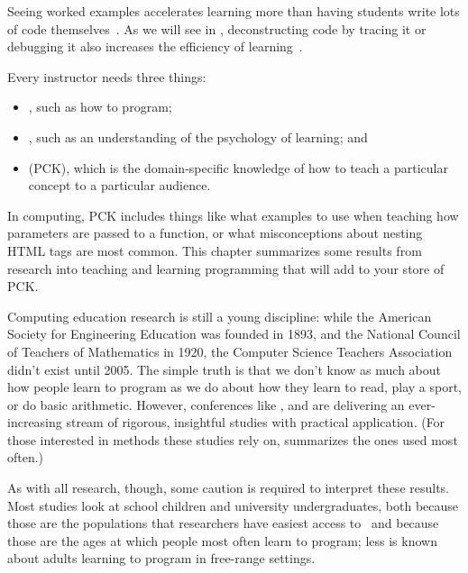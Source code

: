 
  Seeing worked examples accelerates learning
  more than having students write lots of code themselves~\cite{Skud2014}.
  As we will see in ,
  deconstructing code by tracing it or debugging it also increases the efficiency of learning~\cite{Grif2016}.

Every instructor needs three things:

\begin{itemize}
\item
  , such as how to
  program;
\item
  ,
  such as an understanding of the psychology of learning; and
\item
  (PCK), which is the domain-specific knowledge of how to teach a
  particular concept to a particular audience.
\end{itemize}

In computing, PCK includes things like what examples to use when
teaching how parameters are passed to a function, or what misconceptions
about nesting HTML tags are most common. This chapter summarizes some
results from research into teaching and learning programming that will
add to your store of PCK.

Computing education research is still a young discipline: while the
American Society for Engineering Education was founded in 1893, and
the National Council of Teachers of Mathematics in 1920, the Computer
Science Teachers Association didn't exist until 2005. The simple truth
is that we don't know as much about how people learn to program as we
do about how they learn to read, play a sport, or do basic arithmetic.
However, conferences like ,  and
 are delivering an ever-increasing stream of rigorous,
insightful studies with practical application. (For those interested
in methods these studies rely on, \cite{Ihan2016} summarizes the
ones used most often.)

As with all research, though, some caution is required to interpret
these results. Most studies look at school children and university
undergraduates, both because those are the populations that researchers
have easiest access to~\cite{Henr2010} and because those are the ages
at which people most often learn to program; less is known about adults
learning to program in free-range settings.

